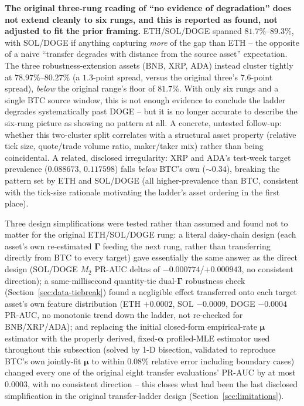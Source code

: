 \textbf{The original three-rung reading of ``no evidence of degradation''
does not extend cleanly to six rungs, and this is reported as found, not
adjusted to fit the prior framing.} ETH/SOL/DOGE spanned $81.7\%$--$89.3\%$,
with SOL/DOGE if anything capturing \emph{more} of the gap than ETH -- the
opposite of a naive ``transfer degrades with distance from the source
asset'' expectation. The three robustness-extension assets (BNB, XRP, ADA)
instead cluster tightly at $78.97\%$--$80.27\%$ (a $1.3$-point spread,
versus the original three's $7.6$-point spread), \emph{below} the
original range's floor of $81.7\%$. With only six rungs and a single BTC
source window, this is not enough evidence to conclude the ladder
degrades systematically past DOGE -- but it is no longer accurate to
describe the six-rung picture as showing no pattern at all. A concrete,
untested follow-up: whether this two-cluster split correlates with a
structural asset property (relative tick size, quote/trade volume ratio,
maker/taker mix) rather than being coincidental. A related, disclosed
irregularity: XRP and ADA's test-week target prevalence
($0.088673$, $0.117598$) falls \emph{below} BTC's own ($\sim 0.34$),
breaking the pattern set by ETH and SOL/DOGE (all higher-prevalence than
BTC, consistent with the tick-size rationale motivating the ladder's
asset ordering in the first place).

Three design simplifications were tested rather than assumed and found not
to matter for the original ETH/SOL/DOGE rung: a literal daisy-chain design
(each asset's own re-estimated $\boldsymbol\Gamma$ feeding the next rung,
rather than transferring directly from BTC to every target) gave
essentially the same answer as the direct design (SOL/DOGE $M_2$ PR-AUC
deltas of $-0.000774$/$+0.000943$, no consistent direction); a
same-millisecond quantity-tie dual-$\boldsymbol\Gamma$ robustness check
(Section~\ref{sec:data-tiebreak}) found a negligible effect transferred
onto each target asset's own feature distribution (ETH $+0.0002$, SOL
$-0.0009$, DOGE $-0.0004$ PR-AUC, no monotonic trend down the ladder,
not re-checked for BNB/XRP/ADA); and replacing the initial closed-form
empirical-rate $\boldsymbol\mu$ estimator with the properly derived,
fixed-$\boldsymbol\alpha$ profiled-MLE estimator used throughout this
subsection (solved by 1-D bisection, validated to reproduce BTC's own
jointly-fit $\boldsymbol\mu$ to within 0.08\% relative error including
boundary cases) changed every one of the original eight transfer
evaluations' PR-AUC by at most $0.0003$, with no consistent direction --
this closes what had been the last disclosed simplification in the
original transfer-ladder design (Section~\ref{sec:limitations}).

